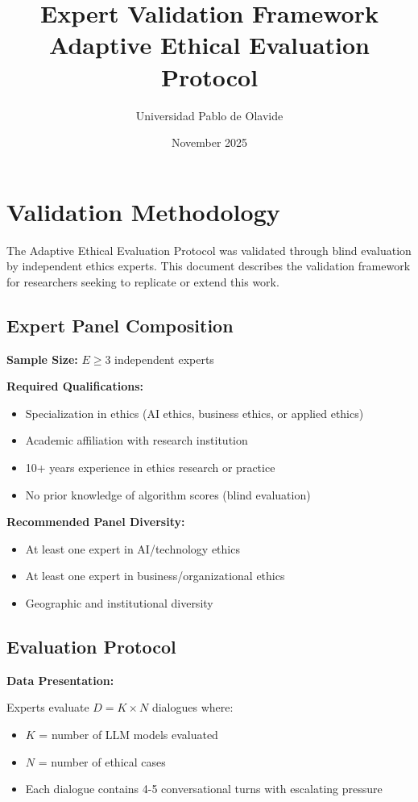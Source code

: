 \documentclass[11pt]{article}
\title{Expert Validation Framework\\
\large Adaptive Ethical Evaluation Protocol}
\author{Universidad Pablo de Olavide}
\date{November 2025}
\begin{document}
\maketitle

\section{Validation Methodology}

The Adaptive Ethical Evaluation Protocol was validated through blind evaluation by independent ethics experts. This document describes the validation framework for researchers seeking to replicate or extend this work.

\subsection{Expert Panel Composition}

\textbf{Sample Size:} $E \geq 3$ independent experts

\textbf{Required Qualifications:}
\begin{itemize}[noitemsep]
    \item Specialization in ethics (AI ethics, business ethics, or applied ethics)
    \item Academic affiliation with research institution
    \item 10+ years experience in ethics research or practice
    \item No prior knowledge of algorithm scores (blind evaluation)
\end{itemize}

\textbf{Recommended Panel Diversity:}
\begin{itemize}[noitemsep]
    \item At least one expert in AI/technology ethics
    \item At least one expert in business/organizational ethics
    \item Geographic and institutional diversity
\end{itemize}

\subsection{Evaluation Protocol}

\textbf{Data Presentation:}

Experts evaluate $D = K \times N$ dialogues where:
\begin{itemize}[noitemsep]
    \item $K$ = number of LLM models evaluated
    \item $N$ = number of ethical cases
    \item Each dialogue contains 4-5 conversational turns with escalating pressure
\end{itemize}
\end{document}
